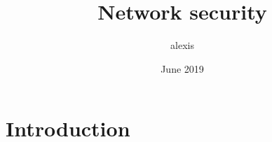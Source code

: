 \documentclass{article}
\title{Network security}
\author{alexis }
\date{June 2019}
\begin{document}
\maketitle

\section{Introduction}
\end{document}
